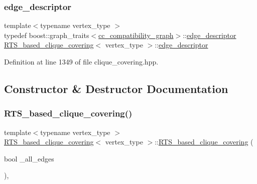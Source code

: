 \subsubsection{\texorpdfstring{edge\+\_\+descriptor}{edge\_descriptor}}
{\footnotesize\ttfamily template$<$typename vertex\+\_\+type $>$ \\
typedef boost\+::graph\+\_\+traits$<$\hyperlink{clique__covering__graph_8hpp_aa88e9419fe776ef37020cacd507cc4ad}{cc\+\_\+compatibility\+\_\+graph}$>$\+::\hyperlink{classTS__based__clique__covering_ab89e23e8ad01980e2ea3ac0d796db907}{edge\+\_\+descriptor} \hyperlink{classRTS__based__clique__covering}{R\+T\+S\+\_\+based\+\_\+clique\+\_\+covering}$<$ vertex\+\_\+type $>$\+::\hyperlink{classTS__based__clique__covering_ab89e23e8ad01980e2ea3ac0d796db907}{edge\+\_\+descriptor}\hspace{0.3cm}{\ttfamily [private]}}



Definition at line 1349 of file clique\+\_\+covering.\+hpp.



\subsection{Constructor \& Destructor Documentation}
\mbox{\label{classRTS__based__clique__covering_a81b1751e2e31ec7dab4e12a2dc9990bd}} 
\subsubsection{\texorpdfstring{R\+T\+S\+\_\+based\+\_\+clique\+\_\+covering()}{RTS\_based\_clique\_covering()}}
{\footnotesize\ttfamily template$<$typename vertex\+\_\+type $>$ \\
\hyperlink{classRTS__based__clique__covering}{R\+T\+S\+\_\+based\+\_\+clique\+\_\+covering}$<$ vertex\+\_\+type $>$\+::\hyperlink{classRTS__based__clique__covering}{R\+T\+S\+\_\+based\+\_\+clique\+\_\+covering} (\begin{DoxyParamCaption}\item[{bool}]{\+\_\+all\+\_\+edges }\end{DoxyParamCaption})\hspace{0.3cm}{\ttfamily [inline]}, {\ttfamily [explicit]}}



